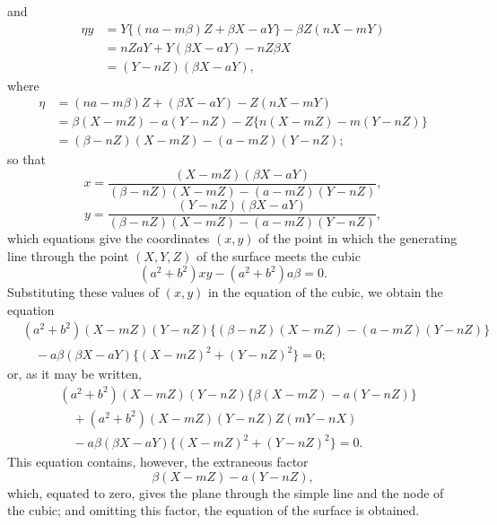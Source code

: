 \documentclass[11pt,a4paper]{article}
\theoremstyle{plain}
\begin{document}
\newpage
and
\begin{align*}
\eta y &= Y\{(na - m\beta)Z + \beta X - aY\} - \beta Z(nX - mY) \\
&= nZaY + Y(\beta X - aY) - nZ\beta X \\
&= (Y - nZ)(\beta X - aY),
\end{align*}
where
\begin{align*}
\eta &= (na - m\beta)Z + (\beta X - aY) - Z(nX - mY) \\
&= \beta(X - mZ) - a(Y - nZ) - Z\{n(X - mZ) - m(Y - nZ)\} \\
&= (\beta - nZ)(X - mZ) - (a - mZ)(Y - nZ);
\end{align*}
so that
\[
x = \frac{(X - mZ)(\beta X - aY)}{(\beta - nZ)(X - mZ) - (a - mZ)(Y - nZ)},
\]
\[
y = \frac{(Y - nZ)(\beta X - aY)}{(\beta - nZ)(X - mZ) - (a - mZ)(Y - nZ)},
\]
which equations give the coordinates $(x, y)$ of the point in which the generating line through the point $(X, Y, Z)$ of the surface meets the cubic
\[
(a^2 + b^2)xy - (a^2 + b^2)a\beta = 0.
\]
Substituting these values of $(x, y)$ in the equation of the cubic, we obtain the equation
\begin{align*}
&(a^2 + b^2)(X - mZ)(Y - nZ)\{(\beta - nZ)(X - mZ) - (a - mZ)(Y - nZ)\} \\
&\quad - a\beta(\beta X - aY)\{(X - mZ)^2 + (Y - nZ)^2\} = 0;
\end{align*}
or, as it may be written,
\begin{align*}
&(a^2 + b^2)(X - mZ)(Y - nZ)\{\beta(X - mZ) - a(Y - nZ)\} \\
&\quad + (a^2 + b^2)(X - mZ)(Y - nZ)Z(mY - nX) \\
&\quad - a\beta(\beta X - aY)\{(X - mZ)^2 + (Y - nZ)^2\} = 0.
\end{align*}
This equation contains, however, the extraneous factor
\[
\beta(X - mZ) - a(Y - nZ),
\]
which, equated to zero, gives the plane through the simple line and the node of the cubic; and omitting this factor, the equation of the surface is obtained.
\end{document}
